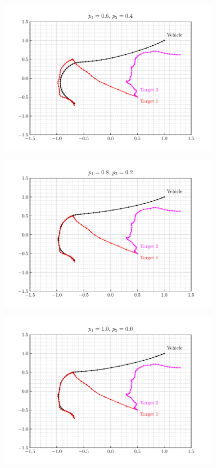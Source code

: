 \documentclass[12pt]{article}
\begin{document}
\begin{figure}[H]
    \centering
    \includegraphics{../../src/task_4/output/ex_4_i=4.pdf}
\end{figure}

\begin{figure}[H]
    \centering
    \includegraphics{../../src/task_4/output/ex_4_i=5.pdf}
\end{figure}

\begin{figure}[H]
    \centering
    \includegraphics{../../src/task_4/output/ex_4_i=6.pdf}
\end{figure}
\end{document}
